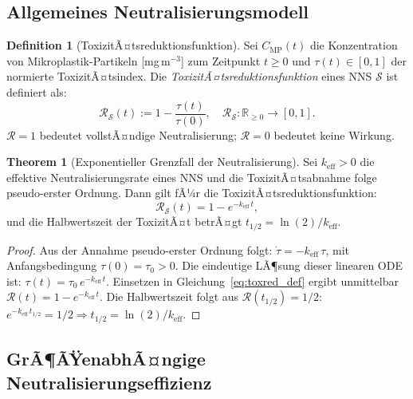 ﻿\documentclass[12pt,a4paper]{article}
\theoremstyle{definition}
\newtheorem{definition}{Definition}[section]
\newtheorem{theorem}{Theorem}[section]
\theoremstyle{remark}
\newcommand{\R}{\mathbb{R}}
\begin{document}
\subsection{Allgemeines Neutralisierungsmodell}

\begin{definition}[ToxizitÃ¤tsreduktionsfunktion]
\label{def:toxred}
Sei $C_{\text{MP}}(t)$ die Konzentration von Mikro\-plastik-Partikeln [mg\,m$^{-3}$]
zum Zeitpunkt $t \geq 0$ und $\tau(t) \in [0,1]$ der normierte ToxizitÃ¤tsindex.
Die \emph{ToxizitÃ¤tsreduktionsfunktion} eines NNS $\mathcal{S}$ ist definiert als:
\begin{equation}
  \mathcal{R}_{\mathcal{S}}(t) := 1 - \frac{\tau(t)}{\tau(0)},
  \quad \mathcal{R}_{\mathcal{S}} : \R_{\geq 0} \to [0,1].
  \label{eq:toxred_def}
\end{equation}
$\mathcal{R} = 1$ bedeutet vollstÃ¤ndige Neutralisierung; $\mathcal{R} = 0$
bedeutet keine Wirkung.
\end{definition}

\begin{theorem}[Exponentieller Grenzfall der Neutralisierung]
\label{thm:exp_limit}
Sei $k_{\text{eff}} > 0$ die effektive Neutralisierungsrate eines NNS und die
ToxizitÃ¤tsabnahme folge pseudo-erster Ordnung. Dann gilt fÃ¼r die
ToxizitÃ¤tsreduktionsfunktion:
\begin{equation}
  \mathcal{R}_{\mathcal{S}}(t) = 1 - e^{-k_{\text{eff}}\,t},
  \label{eq:exp_neutral}
\end{equation}
und die Halbwertszeit der ToxizitÃ¤t betrÃ¤gt $t_{1/2} = \ln(2)/k_{\text{eff}}$.
\end{theorem}

\begin{proof}
Aus der Annahme pseudo-erster Ordnung folgt:
$\dot{\tau} = -k_{\text{eff}}\,\tau$,
mit Anfangsbedingung $\tau(0) = \tau_0 > 0$.
Die eindeutige LÃ¶sung dieser linearen ODE ist:
$\tau(t) = \tau_0\,e^{-k_{\text{eff}}\,t}$.
Einsetzen in Gleichung~\eqref{eq:toxred_def} ergibt unmittelbar
$\mathcal{R}(t) = 1 - e^{-k_{\text{eff}}\,t}$.
Die Halbwertszeit folgt aus $\mathcal{R}(t_{1/2}) = 1/2$:
$e^{-k_{\text{eff}}\,t_{1/2}} = 1/2 \Rightarrow
t_{1/2} = \ln(2)/k_{\text{eff}}$. \hfill
\end{proof}

\subsection{GrÃ¶ÃŸenabhÃ¤ngige Neutralisierungseffizienz}
\end{document}
